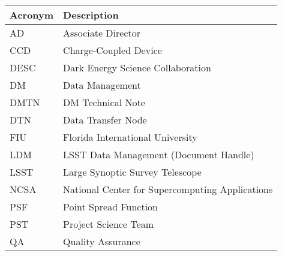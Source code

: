 \addtocounter{table}{-1}
\begin{longtable}{|l|p{}|}\hline
\textbf{Acronym} & \textbf{Description}  \\\hline

AD & Associate Director \\\hline
CCD & Charge-Coupled Device \\\hline
DESC & Dark Energy Science Collaboration \\\hline
DM & Data Management \\\hline
DMTN & \gls{DM} Technical Note \\\hline
DTN & Data Transfer Node \\\hline
FIU & Florida International University \\\hline
LDM & \gls{LSST} Data Management (Document Handle) \\\hline
LSST & Large Synoptic Survey Telescope \\\hline
NCSA & National Center for Supercomputing Applications \\\hline
PSF & Point Spread Function \\\hline
PST & Project Science Team \\\hline
QA & Quality Assurance \\\hline
\end{longtable}
